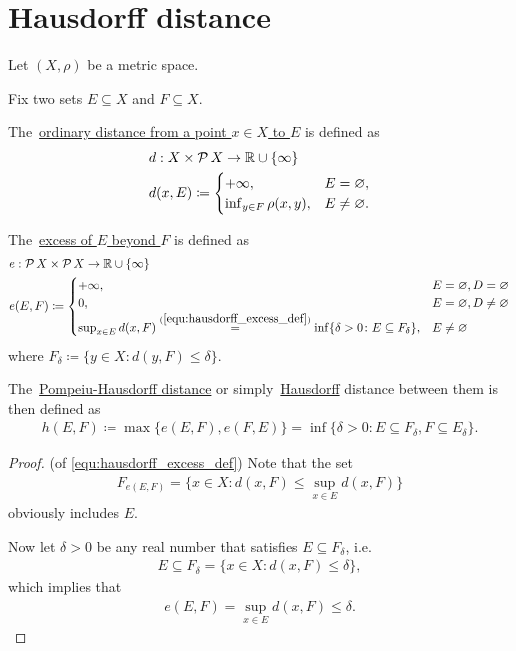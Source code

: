\section{Hausdorff distance}\label{sec:hausdorff_distance}

Let $(X, \rho)$ be a metric space.

\begin{definition}\label{def:hausdorff_distance}\cite[144]{Dontchev2014}
  Fix two sets $E \subseteq X$ and $F \subseteq X$.

  The~\ul{ordinary distance from a point $x \in X$ to $E$} is defined as
  \begin{align*}
    &d: X \times \operatorname{\mathcal P} X \to \mathbb R \cup \{ \infty \}
    \\
    &d(x, E) \coloneqq \begin{cases}
      +\infty, &E = \varnothing, \\
      \inf_{y \in F} \rho(x, y), &E \neq \varnothing.
    \end{cases}
  \end{align*}

  The~\ul{excess of $E$ beyond $F$} is defined as
  \begin{align}\label{equ:hausdorff_excess_def}
    &e: \Power X \times \Power X \to \BB{R} \cup \{ \infty \} \\ \nonumber
    &e(E, F) \coloneqq \begin{cases}
      +\infty, &E = \varnothing, D = \varnothing \\
      0, &E = \varnothing, D \neq \varnothing \\
      \sup_{x \in E} d(x, F) \stackrel{(\ref{equ:hausdorff_excess_def})}{=} \inf \{\delta > 0 \colon E \subseteq F_\delta \}, &E \neq \varnothing \nonumber\refstepcounter{equation}
    \end{cases}
  \end{align}
  where $F_\delta \coloneqq \{ y \in X \colon d(y, F) \leq \delta \}$.

  The~\ul{Pompeiu-Hausdorff distance} or simply~\ul{Hausdorff} distance between them is then defined as
  \begin{align*}
    h(E, F) \coloneqq \max\{ e(E, F), e(F, E) \} = \inf \{\delta > 0 \colon E \subseteq F_\delta, F \subseteq E_\delta \}.
  \end{align*}
\end{definition}
\begin{proof}(of \ref{equ:hausdorff_excess_def})
  Note that the set
  \begin{align*}
    F_{e(E, F)} = \{ x \in X \colon d(x, F) \leq \sup_{x \in E} d(x, F) \}
  \end{align*}
  obviously includes $E$.

  Now let $\delta > 0$ be any real number that satisfies $E \subseteq F_\delta$, i.e.
  \begin{align*}
    E \subseteq F_\delta = \{ x \in X \colon d(x, F) \leq \delta \},
  \end{align*}
  which implies that
  \begin{align*}
    e(E, F) = \sup_{x \in E} d(x, F) \leq \delta.
  \end{align*}
\end{proof}

